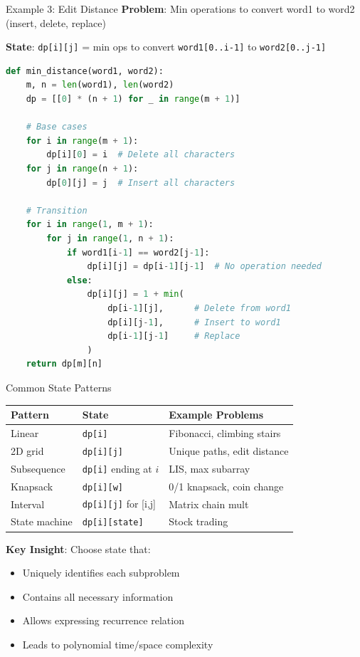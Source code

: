 \documentclass[aspectratio=169]{beamer}
\begin{document}
\begin{frame}[fragile]{Example 3: Edit Distance}
  \textbf{Problem}: Min operations to convert word1 to word2 (insert, delete, replace)

  \vspace{0.3cm}

  \textbf{State}: \texttt{dp[i][j]} = min ops to convert \texttt{word1[0..i-1]} to \texttt{word2[0..j-1]}

\begin{lstlisting}[language=Python, basicstyle=\ttfamily\tiny]
def min_distance(word1, word2):
    m, n = len(word1), len(word2)
    dp = [[0] * (n + 1) for _ in range(m + 1)]

    # Base cases
    for i in range(m + 1):
        dp[i][0] = i  # Delete all characters
    for j in range(n + 1):
        dp[0][j] = j  # Insert all characters

    # Transition
    for i in range(1, m + 1):
        for j in range(1, n + 1):
            if word1[i-1] == word2[j-1]:
                dp[i][j] = dp[i-1][j-1]  # No operation needed
            else:
                dp[i][j] = 1 + min(
                    dp[i-1][j],      # Delete from word1
                    dp[i][j-1],      # Insert to word1
                    dp[i-1][j-1]     # Replace
                )
    return dp[m][n]
\end{lstlisting}
\end{frame}

\begin{frame}{Common State Patterns}
  \begin{center}
  \small
  \begin{tabular}{|l|l|l|}
    \hline
    \textbf{Pattern} & \textbf{State} & \textbf{Example Problems} \\
    \hline
    Linear & \texttt{dp[i]} & Fibonacci, climbing stairs \\
    2D grid & \texttt{dp[i][j]} & Unique paths, edit distance \\
    Subsequence & \texttt{dp[i]} ending at $i$ & LIS, max subarray \\
    Knapsack & \texttt{dp[i][w]} & 0/1 knapsack, coin change \\
    Interval & \texttt{dp[i][j]} for [i,j] & Matrix chain mult \\
    State machine & \texttt{dp[i][state]} & Stock trading \\
    \hline
  \end{tabular}
  \end{center}

  \vspace{0.5cm}

  \textbf{Key Insight}: Choose state that:
  \begin{itemize}
    \item Uniquely identifies each subproblem
    \item Contains all necessary information
    \item Allows expressing recurrence relation
    \item Leads to polynomial time/space complexity
  \end{itemize}
\end{frame}
\end{document}
